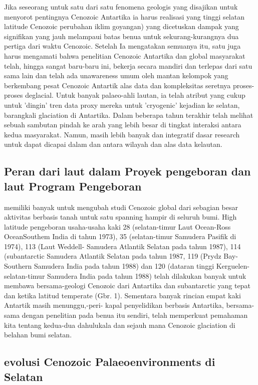 		Jika seseorang untuk satu dari satu fenomena geologis yang disajikan untuk menyorot pentingnya Cenozoic Antartika ia harus realisasi yang tinggi 
	selatan latitude Cenozoic perubahan iklim goyangan) yang dicetuskan dampak yang signifikan yang jauh melampaui batas benua untuk sekurang-kurangnya 
	dua pertiga dari waktu Cenozoic. Setelah Ia mengatakan semuanya itu, satu juga harus mengamati bahwa penelitian Cenozoic Antartika dan global 
	masyarakat telah, hingga sangat baru-baru ini, bekerja secara mandiri dan terlepas dari satu sama lain dan telah ada unawareness umum oleh mantan 
	kelompok yang berkembang pesat Cenozoic Antartik alas data dan kompleksitas seretnya proses-proses deglacial. Untuk banyak palaeo-ahli lautan, 
	ia telah atribut yang cukup untuk 'dingin' tren data proxy mereka untuk 'cryogenic' kejadian ke selatan, barangkali glaciation di Antartika. 
	Dalam beberapa tahun terakhir telah melihat sebuah sambutan pindah ke arah yang lebih besar di tingkat interaksi antara kedua masyarakat. 
	Namun, masih lebih banyak dan integratif dasar research untuk dapat dicapai dalam dan antara wilayah dan alas data kelautan.
	
	
\subsection{Peran dari laut dalam Proyek pengeboran dan laut Program Pengeboran}
		
		memiliki banyak untuk mengubah studi Cenozoic global dari sebagian besar aktivitas berbasis tanah untuk satu spanning hampir di seluruh bumi. 
	High latitude pengeboran usaha-usaha kaki 28 (selatan-timur Laut Ocean-Ross OceanSouthem India di tahun 1973), 35 (selatan-timur Samudera Pasifik di 1974), 
	113 (Laut Weddell- Samudera Atlantik Selatan pada tahun 1987), 114 (subantarctic Samudera Atlantik Selatan pada tahun 1987, 
	119 (Prydz Bay-Southern Samudera India pada tahun 1988) dan 120 (dataran tinggi Kerguelen-selatan-timur Samudera India pada tahun 1988) telah dilakukan 
	banyak untuk membawa bersama-geologi Cenozoic dari Antartika dan subantarctic yang tepat dan ketika latitud temperate (Gbr. 1). 
	Sementara banyak rincian empat kaki Antartik masih menunggu,-peri- kapal penyelidikan berbasis Antartika, bersama-sama dengan penelitian pada benua itu 
	sendiri, telah memperkuat pemahaman kita tentang kedua-dua dahulukala dan sejauh mana Cenozoic glaciation di belahan bumi selatan.
	

\subsection{evolusi Cenozoic Palaeoenvironments di Selatan}

